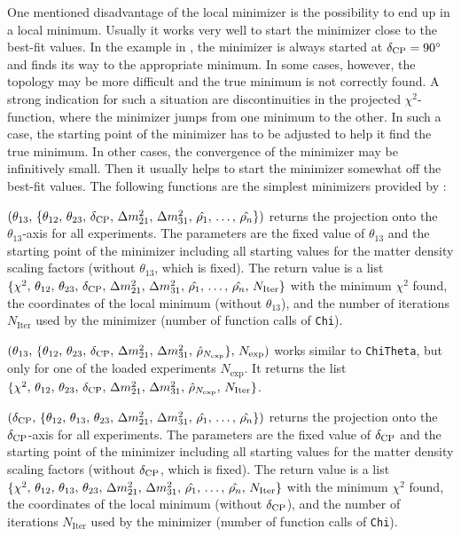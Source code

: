 One mentioned disadvantage of the local minimizer is the possibility to end up in a local minimum. Usually it works very well to start the minimizer close to the best-fit values. In the example in , the minimizer is always started at $\delta_{\mathrm{CP}}=90^\circ$ and finds its way to the appropriate minimum. In some cases, however, the topology may be more difficult and the true minimum is not correctly found. A strong indication for such a situation are discontinuities in the projected $\chi^2$-function, where the minimizer jumps from one minimum to the other. In such a case, the starting point of the minimizer has to be adjusted to help it find the true minimum. In other cases, the convergence of the minimizer may be infinitively small. Then it usually helps to start the minimizer somewhat off the best-fit values. The following functions are the simplest minimizers provided by \GLOBES :
\begin{function}
$( \theta_{13}, \, \{ \theta_{12}, \, \theta_{23}, \, \delta_{\mathrm{CP}} , \, \Delta m_{21}^2 , \, \Delta m_{31}^2, \, \hat{\rho_1}, \,  \hdots ,  \,\hat{\rho_n} \})$ returns the projection onto the $\theta_{13}$-axis for all experiments. The parameters are the fixed value of $\theta_{13}$ and the starting point of the minimizer including all starting values for the matter density scaling factors (without $\theta_{13}$, which is fixed). The return value is a list $\{ \chi^2, \, \theta_{12}, \, \theta_{23}, \, \delta_{\mathrm{CP}} , \, \Delta m_{21}^2 , \, \Delta m_{31}^2, \, \hat{\rho_1}, \, \hdots , \, \hat{\rho_n} , \, N_{\mathrm{Iter}} \}$ with the minimum $\chi^2$ found, the coordinates of the local minimum (without $\theta_{13}$), and the number of iterations $N_{\mathrm{Iter}}$ used by the minimizer (number of function calls of {\tt Chi}).
\end{function}
\begin{function}
$( \theta_{13}, \, \{ \theta_{12}, \, \theta_{23}, \, \delta_{\mathrm{CP}} , \, \Delta m_{21}^2 , \, \Delta m_{31}^2,  \, \hat{\rho}_{N_{\mathrm{exp}}} \}, \, N_{\mathrm{exp}})$ works similar to {\tt ChiTheta}, but only for one of the loaded experiments $N_{\mathrm{exp}}$. It returns the list $\{ \chi^2, \, \theta_{12}, \,  \theta_{23}, \, \delta_{\mathrm{CP}} , \, \Delta m_{21}^2 , \, \Delta m_{31}^2, \, \hat{\rho}_{N_{\mathrm{exp}}} , \, N_{\mathrm{Iter}} \}$.
\end{function}
\begin{function}
$( \delta_{\mathrm{CP}}, \, \{ \theta_{12}, \, \theta_{13}, \, \theta_{23}, \, \Delta m_{21}^2 , \, \Delta m_{31}^2, \, \hat{\rho_1}, \,  \hdots ,  \,\hat{\rho_n} \})$ returns the projection onto the $\delta_{\mathrm{CP}}$-axis for all experiments. The parameters are the fixed value of $\delta_{\mathrm{CP}}$ and the starting point of the minimizer including all starting values for the matter density scaling factors (without $\delta_{\mathrm{CP}}$, which is fixed). The return value is a list $\{ \chi^2, \, \theta_{12}, \, \theta_{13}, \, \theta_{23}, \, \Delta m_{21}^2 , \, \Delta m_{31}^2, \, \hat{\rho_1}, \, \hdots , \, \hat{\rho_n} , \, N_{\mathrm{Iter}} \}$ with the minimum $\chi^2$ found, the coordinates of the local minimum (without $\delta_{\mathrm{CP}}$), and the number of iterations $N_{\mathrm{Iter}}$ used by the minimizer (number of function calls of {\tt Chi}).
\end{function}
